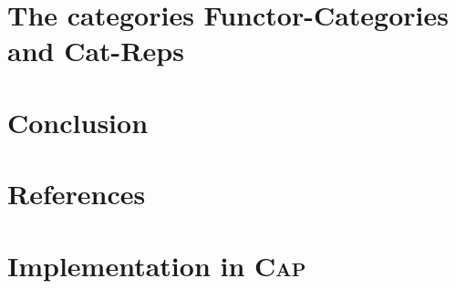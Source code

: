 \documentclass{article}
\begin{document}
\section{The categories Functor-Categories and Cat-Reps}
\section{Conclusion}
\section*{References}
\appendix
\renewcommand{\thesection}{\Alph{section}}
\section{Implementation in \textsc{Cap}}

\end{document}
